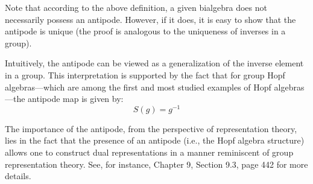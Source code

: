 \documentclass[a4paper,11pt]{report}
\begin{document}
Note that according to the above definition, a given bialgebra does not necessarily possess an antipode. However, if it does, it is easy to show that the antipode is unique (the proof is analogous to the uniqueness of inverses in a group).

Intuitively, the antipode can be viewed as a generalization of the inverse element in a group. This interpretation is supported by the fact that for group Hopf algebras—which are among the first and most studied examples of Hopf algebras—the antipode map is given by:
\[
S(g) = g^{-1}
\]

The importance of the antipode, from the perspective of representation theory, lies in the fact that the presence of an antipode (i.e., the Hopf algebra structure) allows one to construct dual representations in a manner reminiscent of group representation theory. See, for instance, Chapter 9, Section 9.3, page 442 for more details.
\end{document}
